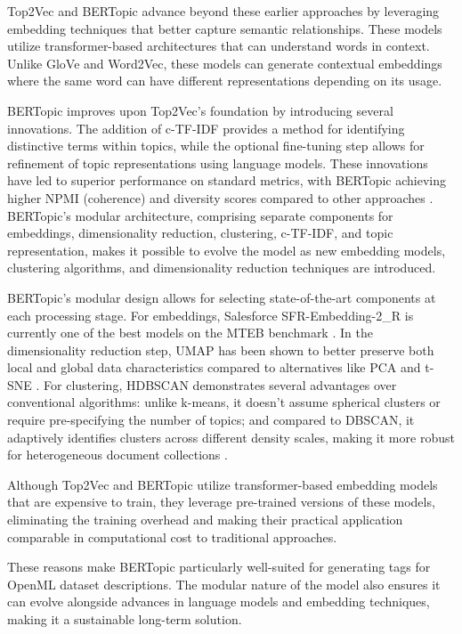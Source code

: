 Top2Vec \cite{angelov_top2vec_2020} and BERTopic \cite{grootendorst_bertopic_2022} advance beyond these earlier approaches by leveraging embedding techniques that better capture semantic relationships. These models utilize transformer-based architectures that can understand words in context. Unlike GloVe and Word2Vec, these models can generate contextual embeddings where the same word can have different representations depending on its usage.

BERTopic improves upon Top2Vec's foundation by introducing several innovations. The addition of c-TF-IDF provides a method for identifying distinctive terms within topics, while the optional fine-tuning step allows for refinement of topic representations using language models. These innovations have led to superior performance on standard metrics, with BERTopic achieving higher NPMI (coherence) and diversity scores compared to other approaches \cite{grootendorst_bertopic_2022}. BERTopic's modular architecture, comprising separate components for embeddings, dimensionality reduction, clustering, c-TF-IDF, and topic representation, makes it possible to evolve the model as new embedding models, clustering algorithms, and dimensionality reduction techniques are introduced. 

BERTopic's modular design allows for selecting state-of-the-art components at each processing stage. For embeddings, Salesforce SFR-Embedding-2\_R \cite{noauthor_salesforcesfr-embedding-2_r_2024} is currently one of the best models on the MTEB benchmark \cite{muennighoff_mteb_2023}. In the dimensionality reduction step, UMAP has been shown to better preserve both local and global data characteristics compared to alternatives like PCA and t-SNE \cite{mcinnes_umap_2020}. For clustering, HDBSCAN demonstrates several advantages over conventional algorithms: unlike k-means, it doesn't assume spherical clusters or require pre-specifying the number of topics; and compared to DBSCAN, it adaptively identifies clusters across different density scales, making it more robust for heterogeneous document collections \cite{campello_density-based_2013, allaoui_considerably_2020}.

Although Top2Vec and BERTopic utilize transformer-based embedding models that are expensive to train, they leverage pre-trained versions of these models, eliminating the training overhead and making their practical application comparable in computational cost to traditional approaches.

These reasons make BERTopic particularly well-suited for generating tags for OpenML dataset descriptions. The modular nature of the model also ensures it can evolve alongside advances in language models and embedding techniques, making it a sustainable long-term solution.



